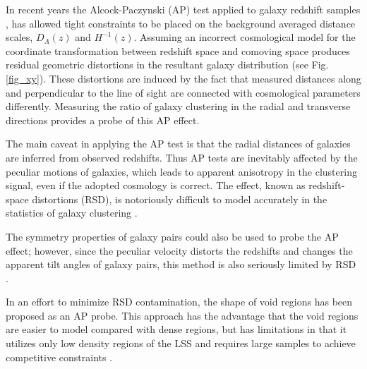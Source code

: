 \documentclass[iop]{emulateapj}
\begin{document}
In recent years the Alcock-Paczynski (AP) test \citep{AP1979} applied to galaxy redshift samples \citep{Outram2004,Blake2011,Alam2016}, 
has allowed tight constraints to be placed on the background averaged distance scales, $D_A(z)$ and $H^{-1}(z)$.  
Assuming an incorrect cosmological model for the coordinate transformation between redshift space and comoving space
produces residual geometric distortions in the resultant galaxy distribution (see  Fig.\ref{fig_xy}). 
These distortions are induced by the fact that measured distances along 
and perpendicular to the line of sight are connected with cosmological parameters differently. 
Measuring the ratio of galaxy clustering in the radial and transverse directions provides a probe of this AP effect.


The main caveat in applying the AP test is that 
the radial distances of galaxies are inferred from observed redshifts.
Thus AP tests are inevitably affected by the peculiar motions of galaxies,
which leads to apparent anisotropy in the clustering signal, even if the adopted cosmology is correct.
The effect, known as redshift-space distortions (RSD),
is notoriously difficult to model accurately in the statistics of galaxy clustering \citep{Ballinger1996}.

The symmetry properties of galaxy pairs\cite{Marinoni2010}  could also be used to probe the AP effect;
however, since the peculiar velocity distorts the redshifts and changes the apparent tilt angles of galaxy pairs,
this method is also seriously limited by RSD \citep{Jennings2011}.

In an effort to minimize RSD contamination, the shape of void regions\cite{Ryden1995,LavausWandelt1995}  has been 
proposed as an AP probe. This approach has the advantage that the void regions are easier to model compared with dense regions, but has limitations in that it utilizes only low density regions of the LSS and requires large samples to achieve competitive constraints \citep{Qingqing2016}.

\end{document}
